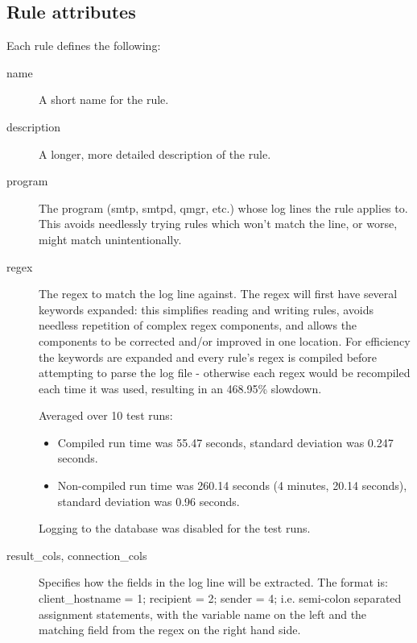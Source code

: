 \documentclass[a4paper,12pt,draft]{article}
\begin{document}
\subsection{Rule attributes}

Each rule defines the following:

\begin{description}

    \item [name] A short name for the rule.

    \item [description] A longer, more detailed description of the rule.

    \item [program] The program (smtp, smtpd, qmgr, etc.) whose log lines
        the rule applies to.  This avoids needlessly trying rules which
        won't match the line, or worse, might match unintentionally.

    \item [regex] The regex to match the log line against.  The regex will
        first have several keywords expanded: this simplifies reading and
        writing rules, avoids needless repetition of complex regex
        components, and allows the components to be corrected and/or
        improved in one location.  For efficiency the keywords are expanded
        and every rule's regex is compiled before attempting to parse the
        log file - otherwise each regex would be recompiled each time it
        was used, resulting in an 468.95\% slowdown.

        Averaged over 10 test runs:

        \begin{itemize} 

            \item Compiled run time was 55.47 seconds, standard deviation
                was 0.247 seconds.

            \item Non-compiled run time was 260.14 seconds (4 minutes,
                20.14 seconds), standard deviation was 0.96 seconds.

        \end{itemize}

        Logging to the database was disabled for the test runs.

    \item [result\_cols, connection\_cols] Specifies how the fields in
        the log line will be extracted.  The format is: \newline
        client\_hostname = 1; recipient = 2; sender = 4; \newline
        i.e. semi-colon separated assignment statements, with the variable
        name on the left and the matching field from the regex on the
        right hand side.


\end{description}
\end{document}
